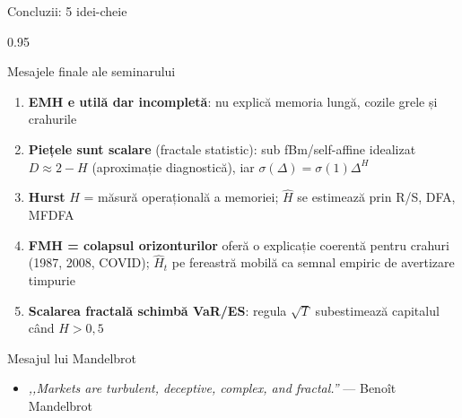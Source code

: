 \documentclass[9pt, aspectratio=169, t]{beamer}
\begin{document}
\begin{frame}[shrink=15]{Concluzii: 5 idei-cheie}
\begin{cminipage}{0.95\textwidth}
\begin{block}{Mesajele finale ale seminarului}
\begin{enumerate}\setlength{\itemsep}{4pt}
    \item \textbf{EMH e utilă dar incompletă}: nu explică memoria lungă, cozile grele și crahurile
    \item \textbf{Piețele sunt scalare} (fractale statistic): sub fBm/self-affine idealizat $D\approx 2-H$ (aproximație diagnostică), iar $\sigma(\Delta)=\sigma(1)\Delta^H$
    \item \textbf{Hurst} $H$ = măsură operațională a memoriei; $\hat H$ se estimează prin R/S, DFA, MFDFA
    \item \textbf{FMH = colapsul orizonturilor} oferă o explicație coerentă pentru crahuri (1987, 2008, COVID); $\hat H_t$ pe fereastră mobilă ca semnal empiric de avertizare timpurie
    \item \textbf{Scalarea fractală schimbă VaR/ES}: regula $\sqrt T$ subestimează capitalul când $H>0{,}5$
\end{enumerate}
\end{block}
\begin{alertblock}{Mesajul lui Mandelbrot}
\begin{itemize}\setlength{\itemsep}{0pt}
    \item \textit{,,Markets are turbulent, deceptive, complex, and fractal.''} --- Benoît Mandelbrot
\end{itemize}
\end{alertblock}
\end{cminipage}
\end{frame}
\end{document}
